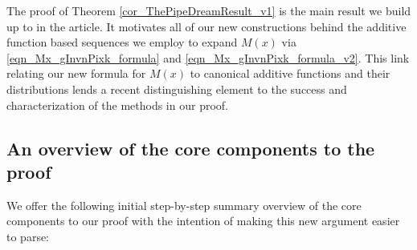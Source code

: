 \documentclass[11pt,reqno,a4letter]{article}
\numberwithin{figure}{section}
\numberwithin{table}{section}
\theoremstyle{plain}
\numberwithin{theorem}{section}
\theoremstyle{definition}
\begin{document}
The proof of Theorem \ref{cor_ThePipeDreamResult_v1} is 
the main result we build up to in the article. 
It motivates all of our new constructions behind the additive function based 
sequences we employ to expand $M(x)$ via 
\eqref{eqn_Mx_gInvnPixk_formula} and 
\eqref{eqn_Mx_gInvnPixk_formula_v2}. 
This link relating our new formula for $M(x)$ 
to canonical additive functions and their 
distributions lends a recent distinguishing element to the 
success and characterization of the methods in our proof. 

\subsection{An overview of the core components to the proof} 

We offer the following initial step-by-step summary overview of the core components 
to our proof with the intention of making this new argument easier to parse: 
\end{document}
